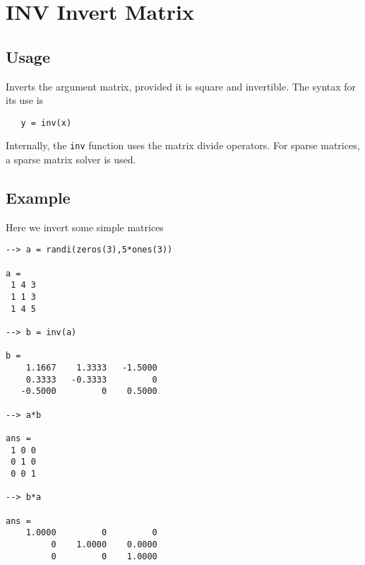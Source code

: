 \section{INV Invert Matrix}

\subsection{Usage}

Inverts the argument matrix, provided it is square and invertible.
The syntax for its use is
\begin{verbatim}
   y = inv(x)
\end{verbatim}
Internally, the \verb|inv| function uses the matrix divide operators.
For sparse matrices, a sparse matrix solver is used.
\subsection{Example}

Here we invert some simple matrices
\begin{verbatim}
--> a = randi(zeros(3),5*ones(3))

a = 
 1 4 3 
 1 1 3 
 1 4 5 

--> b = inv(a)

b = 
    1.1667    1.3333   -1.5000 
    0.3333   -0.3333         0 
   -0.5000         0    0.5000 

--> a*b

ans = 
 1 0 0 
 0 1 0 
 0 0 1 

--> b*a

ans = 
    1.0000         0         0 
         0    1.0000    0.0000 
         0         0    1.0000 
\end{verbatim}
